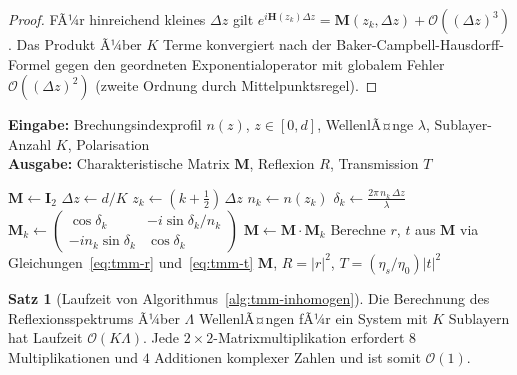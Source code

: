 ﻿\documentclass[a4paper,12pt]{article}
\theoremstyle{definition}
\newtheorem{satz}{Satz}[section]
\newcommand{\ordre}[1]{\mathcal{O}\!\left(#1\right)}
\newcommand{\matr}[1]{\mathbf{#1}}
\begin{document}
	\begin{proof}
		FÃ¼r hinreichend kleines $\Delta z$ gilt $e^{i\matr{H}(z_k)\Delta z}
		= \matr{M}(z_k, \Delta z) + \ordre{(\Delta z)^3}$.
		Das Produkt Ã¼ber $K$ Terme konvergiert nach der Baker-Campbell-Hausdorff-Formel
		gegen den geordneten Exponentialoperator mit globalem Fehler $\ordre{(\Delta z)^2}$
		(zweite Ordnung durch Mittelpunktsregel).
	\end{proof}
	
	\begin{algorithm}[htb]
		\caption{TMM fÃ¼r inhomogene Schicht mit kontinuierlichem $n(z)$-Profil}
		\label{alg:tmm-inhomogen}
		\textbf{Eingabe:} Brechungsindexprofil $n(z)$, $z \in [0, d]$,
		WellenlÃ¤nge $\lambda$, Sublayer-Anzahl $K$, Polarisation\\
		\textbf{Ausgabe:} Charakteristische Matrix $\matr{M}$, Reflexion $R$, Transmission $T$
		\begin{algorithmic}[1]
			\State $\matr{M} \gets \matr{I}_2$ 
			\State $\Delta z \gets d / K$
			\State $z_k \gets (k + \tfrac{1}{2})\,\Delta z$ 
			\State $n_k \gets n(z_k)$ 
			\State $\delta_k \gets \frac{2\pi\, n_k\, \Delta z}{\lambda}$
			\State $\matr{M}_k \gets \begin{pmatrix}
				\cos\delta_k & -i\sin\delta_k/n_k \\
				-in_k\sin\delta_k & \cos\delta_k
			\end{pmatrix}$
			\State $\matr{M} \gets \matr{M} \cdot \matr{M}_k$ 
			\EndFor
			\State Berechne $r$, $t$ aus $\matr{M}$ via Gleichungen~\eqref{eq:tmm-r}
			und~\eqref{eq:tmm-t}
			\State \Return $\matr{M}$, $R = |r|^2$, $T = (\eta_s/\eta_0)|t|^2$
		\end{algorithmic}
	\end{algorithm}
	
	\begin{satz}[Laufzeit von Algorithmus~\ref{alg:tmm-inhomogen}]
		\label{satz:tmm-laufzeit}
		Die Berechnung des Reflexionsspektrums Ã¼ber $\Lambda$ WellenlÃ¤ngen
		fÃ¼r ein System mit $K$ Sublayern hat Laufzeit $\ordre{K\Lambda}$.
		Jede $2\times 2$-Matrixmultiplikation erfordert $8$ Multiplikationen
		und $4$ Additionen komplexer Zahlen und ist somit $\ordre{1}$.
	\end{satz}
	
\end{document}
